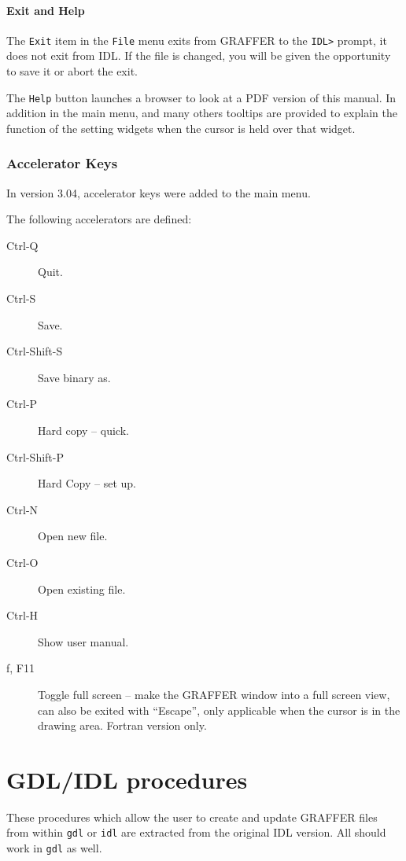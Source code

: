 \documentclass[11pt,twoside,english]{article}
\begin{document}
\subsection{Exit and Help}

The \texttt{Exit} item in the \texttt{File} menu exits from GRAFFER to
the \texttt{IDL>} prompt, it does not exit from IDL. If the file is
changed, you will be given the opportunity to save it or abort the
exit.

The \texttt{Help} button launches a browser to look at a PDF version of
this manual. In addition in the main menu, and many others tooltips are
provided to explain the function of the setting widgets when the cursor
is held over that widget.

\section{Accelerator Keys}
\label{sec:accel}

In version 3.04, accelerator keys were added to the main menu.

The following accelerators are defined:
\begin{description}
\item[Ctrl-Q] Quit.
\item[Ctrl-S] Save.
\item[Ctrl-Shift-S] Save binary as.
\item[Ctrl-P] Hard copy -- quick.
\item[Ctrl-Shift-P] Hard Copy -- set up.
\item[Ctrl-N] Open new file.
\item[Ctrl-O] Open existing file.
\item[Ctrl-H] Show user manual.
\item[f, F11] Toggle full screen -- make the GRAFFER window into a full
  screen view, can also be exited with ``Escape'', only applicable when
  the cursor is in the drawing area. Fortran version only.
\end{description}

\part{GDL/IDL procedures}
\label{part:gdl}

These procedures which allow the user to create and update GRAFFER
files from within \texttt{gdl} or \texttt{idl} are extracted from the
original IDL version. All should work in \texttt{gdl} as well.
\end{document}
